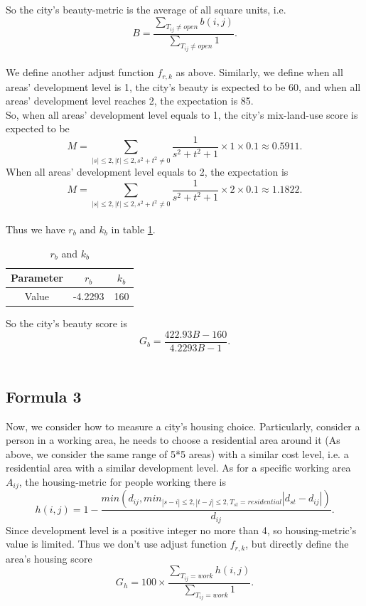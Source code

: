 So the city's beauty-metric is the average of all square units, i.e. $$ B=\frac{\sum_{T_{ij}\neq open} b(i,j)}{\sum_{T_{ij}\neq open} 1}. $$\\

We define another adjust function $ f_{r,k} $ as above.
Similarly, we define when all areas' development level is 1, the city's beauty is expected to be 60, and when all areas' development level reaches 2, the expectation is 85.\\

So, when all areas' development level equals to 1, the city's mix-land-use score is expected to be $$ M=\sum_{|s|\leq 2, |t|\leq 2, s^2+t^2 \neq 0} \frac{1}{s^2+t^2+1} \times 1 \times 0.1 \approx 0.5911. $$
When all areas' development level equals to 2, the expectation is $$ M=\sum_{|s|\leq 2, |t|\leq 2, s^2+t^2 \neq 0} \frac{1}{s^2+t^2+1} \times 2 \times 0.1 \approx 1.1822. $$\\

Thus we have $ r_b $ and $ k_b $ in table \ref{tab:f2-data}.\\
\begin{table}[t]
\centering
  \begin{tabular}{c|cc}
    \hline
    Parameter & $r_b$ & $k_b$ \\
    \hline
    Value & -4.2293 & 160 \\
    \hline
  \end{tabular}
  \caption{$r_b$ and $k_b$}
  \label{tab:f2-data}
\end{table}

So the city's beauty score is $$ G_b=\frac{422.93B-160}{4.2293B-1}. $$\\

\subsection{Formula 3}
Now, we consider how to measure a city's housing choice.
Particularly, consider a person in a working area, he needs to choose a residential area around it (As above, we consider the same range of 5*5 areas) with a similar cost level, i.e. a residential area with a similar development level.
As for a specific working area $ A_{ij} $, the housing-metric for people working there is $$ h(i,j) = 1 - \frac{min(d_{ij}, min_{|s-i|\leq 2, |t-j|\leq 2, T_{st}=residential} |d_{st} - d_{ij}|)}{d_{ij}}. $$
Since development level is a positive integer no more than 4, so housing-metric's value is limited.
Thus we don't use adjust function $ f_{r,k} $, but directly define the area's housing score $$ G_h = 100 \times \frac{\sum_{T_{ij}=work} h(i,j)}{\sum_{T_{ij}=work} 1}. $$\\

